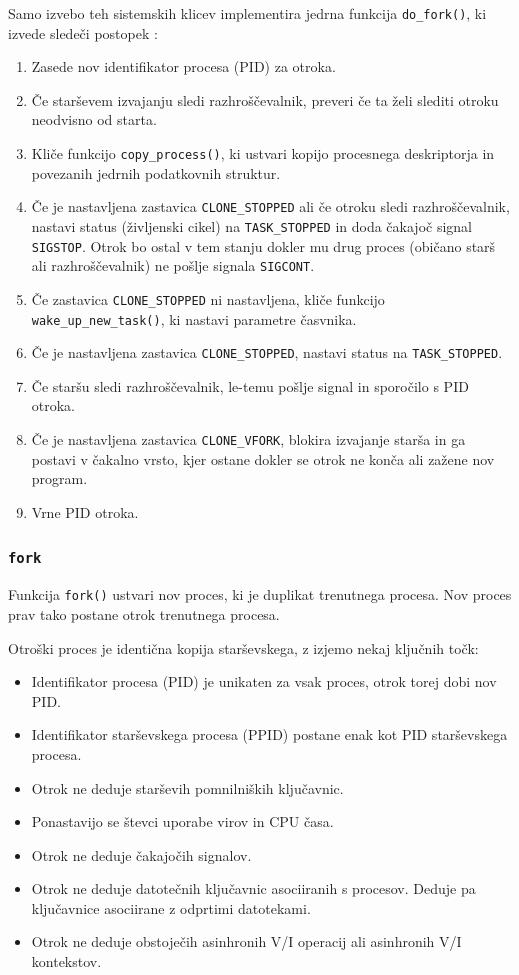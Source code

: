 \documentclass[a4paper,12pt,openright]{book}
\begin{document}
Samo izvebo teh sistemskih klicev implementira jedrna funkcija \texttt{do\_fork()}, ki izvede sledeči postopek \cite{Bovet_Cesati_2005}:
\begin{enumerate}
	\item Zasede nov identifikator procesa (PID) za otroka.
	\item Če starševem izvajanju sledi razhroščevalnik, preveri če ta želi slediti otroku neodvisno od starta.
	\item Kliče funkcijo \texttt{copy\_process()}, ki ustvari kopijo procesnega deskriptorja in povezanih jedrnih podatkovnih struktur.
	\item Če je nastavljena zastavica \texttt{CLONE\_STOPPED} ali če otroku sledi razhroščevalnik, nastavi status (življenski cikel) na \texttt{TASK\_STOPPED} in doda čakajoč signal \texttt{SIGSTOP}.
	      Otrok bo ostal v tem stanju dokler mu drug proces (običano starš ali razhroščevalnik) ne pošlje signala \texttt{SIGCONT}.
	\item Če zastavica \texttt{CLONE\_STOPPED} ni nastavljena, kliče funkcijo \texttt{wake\_up\_new\_task()}, ki nastavi parametre časvnika.
	\item Če je nastavljena zastavica \texttt{CLONE\_STOPPED}, nastavi status na \texttt{TASK\_STOPPED}.
	\item Če staršu sledi razhroščevalnik, le-temu pošlje signal in sporočilo s PID otroka.
	\item Če je nastavljena zastavica \texttt{CLONE\_VFORK}, blokira izvajanje starša in ga postavi v čakalno vrsto, kjer ostane dokler se otrok ne konča ali zažene nov program.
	\item Vrne PID otroka.
\end{enumerate}

\subsubsection{\texttt{fork}}

Funkcija \texttt{fork()} ustvari nov proces, ki je duplikat trenutnega procesa.
Nov proces prav tako postane otrok trenutnega procesa.

Otroški proces je identična kopija starševskega, z izjemo nekaj ključnih točk:
\begin{itemize}
	\item Identifikator procesa (PID) je unikaten za vsak proces, otrok torej dobi nov PID.
	\item Identifikator starševskega procesa (PPID) postane enak kot PID starševskega procesa.
	\item Otrok ne deduje starševih pomnilniških ključavnic.
	\item Ponastavijo se števci uporabe virov in CPU časa.
	\item Otrok ne deduje čakajočih signalov.
	\item Otrok ne deduje datotečnih ključavnic asociiranih s procesov. Deduje pa ključavnice asociirane z odprtimi datotekami.
	\item Otrok ne deduje obstoječih asinhronih V/I operacij ali asinhronih V/I kontekstov.
\end{itemize}
\end{document}
